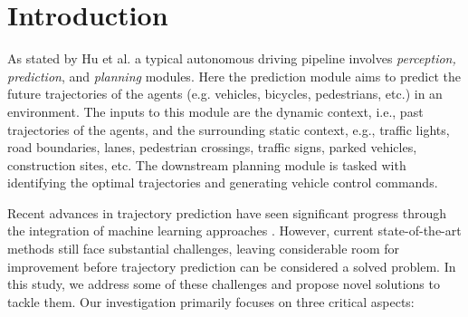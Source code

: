 \section{Introduction}\label{section:introduction}
As stated by Hu et al. a typical autonomous driving pipeline involves \textit{perception, prediction}, and \textit{planning} \cite{hu2023planning} modules. Here the prediction module aims to predict the future trajectories of the agents (e.g. vehicles, bicycles, pedestrians, etc.) in an environment. The inputs to this module are the dynamic context, i.e., past trajectories of the agents, and the surrounding static context, e.g., traffic lights, road boundaries, lanes, pedestrian crossings, traffic signs, parked vehicles, construction sites, etc. The downstream planning module is tasked with identifying the optimal trajectories and generating vehicle control commands. 


Recent advances in trajectory prediction have seen significant progress through the integration of machine learning approaches \cite{cui2019multimodal,gao2020vectornet,ngiam2021scene,zhou2023query,lan2023sept,seff2023motionlm,sun2024semanticformer,liu2024laformer,yadav2025caspformer}. However, current state-of-the-art methods still face substantial challenges, leaving considerable room for improvement before trajectory prediction can be considered a solved problem. In this study, we address some of these challenges and propose novel solutions to tackle them. Our investigation primarily focuses on three critical aspects: 

